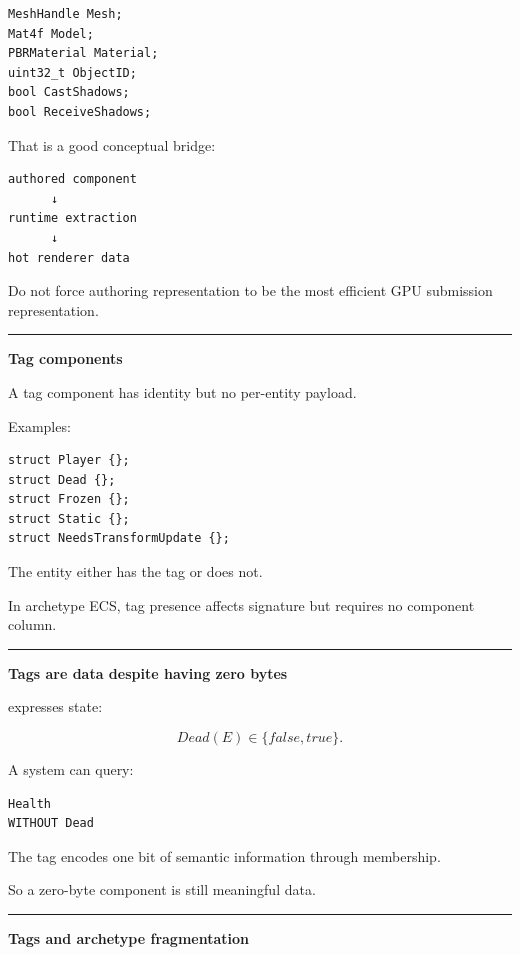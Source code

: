 \begin{verbatim}
MeshHandle Mesh;
Mat4f Model;
PBRMaterial Material;
uint32_t ObjectID;
bool CastShadows;
bool ReceiveShadows;
\end{verbatim}

That is a good conceptual bridge:

\begin{verbatim}
authored component
      ↓
runtime extraction
      ↓
hot renderer data
\end{verbatim}

Do not force authoring representation to be the most efficient GPU submission representation.

\begin{center}\rule{0.5\linewidth}{0.5pt}\end{center}

\textbf{Tag components}

A tag component has identity but no per-entity payload.

Examples:

\begin{verbatim}
struct Player {};
struct Dead {};
struct Frozen {};
struct Static {};
struct NeedsTransformUpdate {};
\end{verbatim}

The entity either has the tag or does not.

In archetype ECS, tag presence affects signature but requires no component column.

\begin{center}\rule{0.5\linewidth}{0.5pt}\end{center}

\textbf{Tags are data despite having zero bytes}

 expresses state:

\[
Dead(E)\in\{false,true\}.
\]

A system can query:

\begin{verbatim}
Health
WITHOUT Dead
\end{verbatim}

The tag encodes one bit of semantic information through membership.

So a zero-byte component is still meaningful data.

\begin{center}\rule{0.5\linewidth}{0.5pt}\end{center}

\textbf{Tags and archetype fragmentation}

